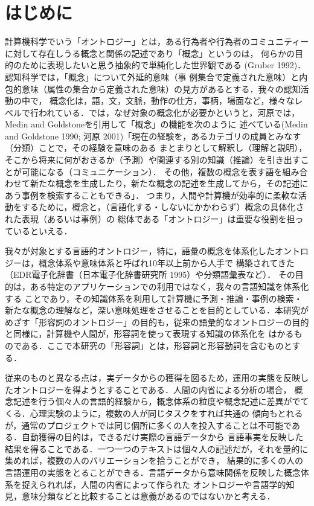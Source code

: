 \documentclass[japanese]{jnlp_1.4}
\begin{document}
\maketitle

\section{はじめに}

計算機科学でいう「オントロジー」とは，ある行為者や行為者のコミュニティーに対して存在しうる概念と関係の記述であり「概念」というのは，
何らかの目的のために表現したいと思う抽象的で単純化した世界観である
(Gruber 1992)．認知科学では，「概念」について外延的意味（事
例集合で定義された意味）と内包的意味（属性の集合から定義された意味）の見方があるとする\cite{Book_02}．我々の認知活動の中で，
概念化は，語，文，文脈，動作の仕方，事柄，場面など，様々なレベルで行われている．では，なぜ対象の概念化が必要かというと，河原では，
    Medin and Goldstone\nocite{book_24}を引用して「概念」の機能を次のように
述べている(Medin and Goldstone 1990; 河原 2001)「現在の経験を，あるカテゴリの成員とみなす（分類）ことで，その経験を意味のある
まとまりとして解釈し（理解と説明），そこから将来に何がおきるか（予測）や関連する別の知識（推論）を引き出すことが可能になる（コミュニケーション）．
その他，複数の概念を表す語を組み合わせて新たな概念を生成したり，新たな概念の記述を生成してから，その記述にあう事例を検索することもできる」．
つまり，人間や計算機が効率的に柔軟な活動をするために，概念と，（言語化する・しないにかかわらず）概念の具体化された表現（あるいは事例）の
総体である「オントロジー」は重要な役割を担っているといえる．

我々が対象とする言語的オントロジー，特に，語彙の概念を体系化したオントロジーは，概念体系や意味体系と呼ばれ10年以上前から人手で
構築されてきた（EDR電子化辞書（日本電子化辞書研究所 1995）や分類語彙表\cite{book_16}など）．
その目的は，ある特定のアプリケーションでの利用ではなく，我々の言語知識を体系化する
ことであり，その知識体系を利用して計算機に予測・推論・事例の検索・新たな概念の理解など，深い意味処理をさせることを目的としている．本研究が
めざす「形容詞のオントロジー」の目的も，従来の語彙的なオントロジーの目的と同様に，計算機や人間が，形容詞を使って表現する知識の体系化を
はかるものである．ここで本研究の「形容詞」とは，形容詞と形容動詞を含むものとする．

従来のものと異なる点は，実データからの獲得を図るため，運用の実態を反映したオントロジーを得ようとすることである．人間の内省による分析の場合，
概念記述を行う個々人の言語的経験から，概念体系の粒度や概念記述に差異がでてくる．心理実験のように，複数の人が同じタスクをすれば共通の
傾向もとれるが，通常のプロジェクトでは同じ個所に多くの人を投入することは不可能である．自動獲得の目的は，できるだけ実際の言語データから
言語事実を反映した結果を得ることである．一つ一つのテキストは個々人の記述だが，それを量的に集めれば，複数の人のバリエーションを拾うことができ，
結果的に多くの人の言語運用の実態をとることができる．言語データから意味関係を反映した概念体系を捉えられれば，人間の内省によって作られた
オントロジーや言語学的知見，意味分類などと比較することは意義があるのではないかと考える．
\end{document}
